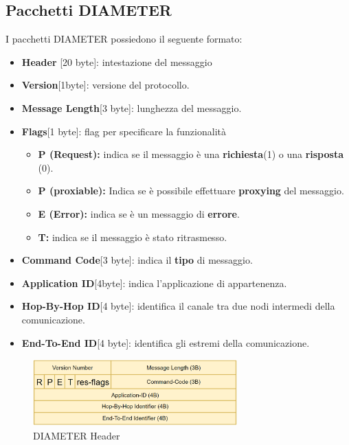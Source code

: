 \subsection{Pacchetti DIAMETER}
I pacchetti DIAMETER possiedono il seguente formato:
\begin{itemize}
    \item \textbf{Header} [20 byte]: intestazione del messaggio
\end{itemize}
\begin{definition}
\begin{itemize}
    \item \textbf{Version}[1byte]: versione del protocollo.
    \item \textbf{Message Length}[3 byte]: lunghezza del messaggio.
    \item \textbf{Flags}[1 byte]: flag per specificare la funzionalità
    \begin{itemize}
        \item \textbf{P (Request):} indica se il messaggio è una \textbf{richiesta}(1) o una \textbf{risposta} (0).
        \item \textbf{P (proxiable):} Indica se è possibile effettuare \textbf{proxying} del messaggio.
        \item \textbf{E (Error):} indica se è un messaggio di \textbf{errore}.
        \item \textbf{T:} indica se il messaggio è stato ritrasmesso.
    \end{itemize}
    \item \textbf{Command Code}[3 byte]: indica il \textbf{tipo} di messaggio.
    \item \textbf{Application ID}[4byte]: indica l'applicazione di appartenenza.
    \item \textbf{Hop-By-Hop ID}[4 byte]: identifica il canale tra due nodi intermedi della comunicazione.
    \item \textbf{End-To-End ID}[4 byte]: identifica gli estremi della comunicazione.
\end{itemize}
\end{definition}
\begin{figure}[h]
    \centering
    \includegraphics[width=0.7\textwidth]{image/diamheader.png}
    \caption{DIAMETER Header}
    \label{fig:diamheader}
\end{figure}
